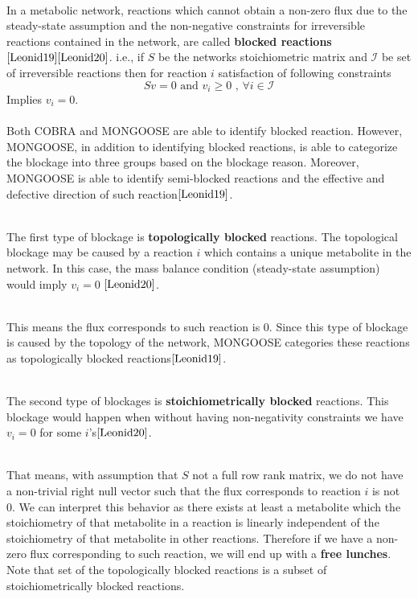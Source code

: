 \documentclass[11pt, a4paper]{article}
\begin{document}
	~\\In a metabolic network, reactions which cannot obtain a non-zero flux due to the steady-state assumption and the non-negative constraints for irreversible reactions contained in the network, are called \textbf{blocked reactions}$\cite{Leonid19}\cite{Leonid20}$. i.e., if $S$ be the networks stoichiometric matrix and $\mathcal{I}$ be set of irreversible reactions then for reaction $i$ satisfaction of following constraints
	$$Sv=0 \text{ and }v_i\geq 0 \text{ , } \forall i\in \mathcal{I}$$
	Implies $v_i=0$.\\

	~\\Both COBRA and MONGOOSE are able to identify blocked reaction. However, MONGOOSE, in addition to identifying blocked reactions, is able to categorize the blockage into three groups based on the blockage reason. Moreover, MONGOOSE is able to identify semi-blocked reactions and the effective and defective direction of such reaction$\cite{Leonid19}$.

	~\\The first type of blockage is \textbf{topologically blocked} reactions. The topological blockage may be caused by a reaction $i$ which contains a unique metabolite in the network. In this case, the mass balance condition (steady-state assumption) would imply $v_i=0$ $\cite{Leonid20}$.

	~\\This means the flux corresponds to such reaction is 0. Since this type of blockage is caused by the topology of the network, MONGOOSE categories these reactions as topologically blocked reactions$\cite{Leonid19}$.

	~\\The second type of blockages is \textbf{stoichiometrically blocked} reactions. This blockage would happen when without having non-negativity constraints we have $v_i=0$ for some $i$'s$\cite{Leonid20}$.

	~\\That means, with assumption that $S$ not a full row rank matrix, we do not have a non-trivial right null vector such that the flux corresponds to reaction $i$ is not 0. We can interpret this behavior as there exists at least a metabolite which the stoichiometry of that metabolite in a reaction is linearly independent of the stoichiometry of that metabolite in other reactions. Therefore if we have a non-zero flux corresponding to such reaction, we will end up with a \textbf{free lunches}. Note that set of the topologically blocked reactions is a subset of stoichiometrically blocked reactions. 
\end{document}
